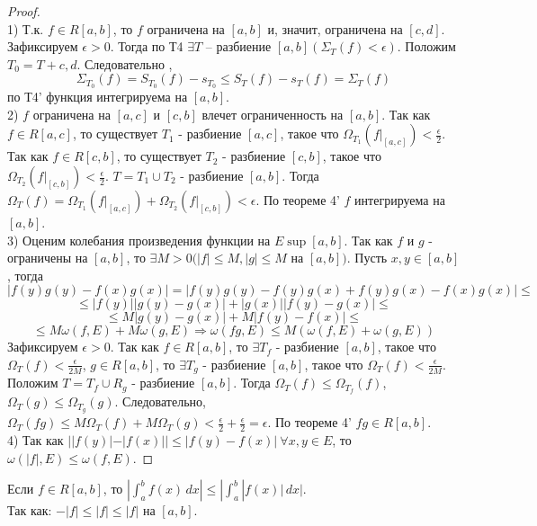 \begin{proof} \ \\
    1) Т.к. $f \in R[a,b]$, то $f$ ограничена на $[a, b]$ и, значит, ограничена на $[c, d]$.
    Зафиксируем $\epsilon > 0$. Тогда по Т4 $\exists T$ -- разбиение $[a, b](\Sigma_{T}(f) < \epsilon)$.
    Положим $T_{0} = T + {c, d}$. Следовательно , 
    \[\Sigma_{T_{0}}(f) = S_{T_{0}}(f) - s_{T_{0}} \leq S_{T}(f) - s_{T}(f) = \Sigma_{T}(f)\]
    по Т4' функция интегрируема на $[a,b]$.
    \\2) $f$ ограничена на $[a, c]$ и $[c, b]$ влечет ограниченность на $[a, b]$.
    Так как $f \in R[a, c]$, то существует $T_1$ - разбиение $[a, c]$,
    такое что $\Omega_{T_1}(f|_{[a, c]}) < \frac{\epsilon}{2}$.
    Так как $f \in R[c, b]$, то существует $T_2$ - разбиение $[c, b]$,
    такое что $\Omega_{T_2}(f|_{[c, b]}) < \frac{\epsilon}{2}$.
    $T = T_1 \cup T_2$ - разбиение $[a, b]$.
    Тогда $\Omega_{T}(f) = \Omega_{T_1}(f|_{[a, c]}) + \Omega_{T_2}(f|_{[c, b]}) < \epsilon$.
    По теореме 4' $f$ интегрируема на $[a, b]$.
    \\3) Оценим колебания произведения функции на $E \sup [a, b]$.
    Так как $f$ и $g$ - ограничены на $[a, b]$, то $\exists M > 0 (|f| \leq M, |g| \leq M$ на $[a, b])$.
    Пусть $x, y \in [a, b]$, тогда
    \[|f(y)g(y) - f(x)g(x)| = |f(y)g(y) - f(y)g(x) + f(y)g(x) - f(x)g(x)| \leq\]
    \[\leq |f(y)||g(y) - g(x)| + |g(x)||f(y) - g(x)| \leq\]
    \[\leq M|g(y) - g(x)| + M|f(y) - f(x)| \leq \]
    \[\leq M\omega(f, E) + M\omega(g, E) \Rightarrow \omega(fg, E) \leq M(\omega(f, E) + \omega(g, E))\]
    Зафиксируем $\epsilon > 0$. Так как $f \in R[a, b]$, то $\exists T_f$ - разбиение $[a, b]$,
    такое что $\Omega_T(f) < \frac{\epsilon}{2M}$, $g \in R[a, b]$, то $\exists T_g$ - разбиение $[a, b]$,
    такое что $\Omega_T(f) < \frac{\epsilon}{2M}$.
    Положим $T = T_f \cup R_g$ - разбиение $[a, b]$. Тогда $\Omega_T(f) \leq \Omega_{T_f}(f)$,
    $\Omega_T(g) \leq \Omega_{T_g}(g)$. Следовательно, $\Omega_T(fg) \leq M\Omega_T(f) + M\Omega_T(g) <
    \frac{\epsilon}{2} + \frac{\epsilon}{2} = \epsilon$.
    По теореме 4' $fg \in R[a, b]$.
    \\4) Так как $||f(y)| - |f(x)|| \leq |f(y) - f(x)| \ \forall x, y \in E$,
    то $\omega(|f|, E) \leq \omega(f, E)$.
\end{proof}

\begin{corollary}
    Если $f \in R[a, b]$, то $|\int_a^b f(x) \,dx| \leq |\int_a^b|f(x)| \,dx|$.
    \\Так как: $-|f| \leq |f| \leq |f|$ на $[a, b]$.
\end{corollary}

